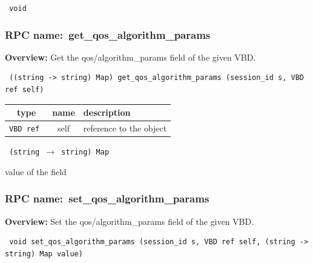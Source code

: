 \vspace{0.3cm}

{\tt 
void
}



\vspace{0.3cm}
\vspace{0.3cm}
\vspace{0.3cm}
\subsubsection{RPC name:~get\_qos\_algorithm\_params}

{\bf Overview:} 
Get the qos/algorithm\_params field of the given VBD.

\begin{verbatim} ((string -> string) Map) get_qos_algorithm_params (session_id s, VBD ref self)\end{verbatim}



 
\vspace{0.3cm}
\begin{tabular}{|c|c|p{7cm}|}
 \hline
{\bf type} & {\bf name} & {\bf description} \\ \hline
{\tt VBD ref } & self & reference to the object \\ \hline 

\end{tabular}

\vspace{0.3cm}

{\tt 
(string $\rightarrow$ string) Map
}


value of the field
\vspace{0.3cm}
\vspace{0.3cm}
\vspace{0.3cm}
\subsubsection{RPC name:~set\_qos\_algorithm\_params}

{\bf Overview:} 
Set the qos/algorithm\_params field of the given VBD.

\begin{verbatim} void set_qos_algorithm_params (session_id s, VBD ref self, (string -> string) Map value)\end{verbatim}



